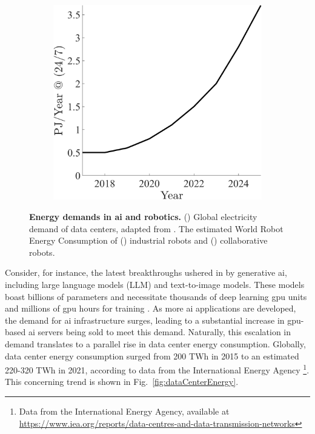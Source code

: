 \documentclass[12pt]{article}
\begin{document}
\begin{figure}[t!]
\begin{subfigure}[b]{0.30\textwidth}
	\end{subfigure}
	\hfill
	\begin{subfigure}[b]{0.30\textwidth}
		\subcaption{}
		\includegraphics[width=\textwidth]{cb_energy_projections.png} \label{fig:cobot_energy}
	\end{subfigure}	
	\hspace*{\fill}
	\caption[] {\label{fig:energy_demands_AI_robotics} \textbf{Energy demands in \ac{ai} and robotics.} () Global electricity demand of data centers, adapted from \cite{andrae2015global}. The estimated World Robot Energy Consumption of () industrial robots and () collaborative robots.}
\end{figure}

Consider, for instance, the latest breakthroughs ushered in by generative \ac{ai}, including large language models (LLM) and text-to-image models. These models boast billions of parameters and necessitate thousands of deep learning \ac{gpu} units and millions of \ac{gpu} hours for training \cite{Vanian2023ChatGPTgenerativeAI, Corbyn2023Nvidiachipmaker}. As more \ac{ai} applications are developed, the demand for \ac{ai} infrastructure surges, leading to a substantial increase in \ac{gpu}-based \ac{ai} servers being sold to meet this demand. Naturally, this escalation in demand translates to a parallel rise in data center energy consumption. Globally, data center energy consumption surged from 200 TWh in 2015 to an estimated 220-320 TWh in 2021, according to data from the International Energy Agency \footnote{Data from the International Energy Agency, available at \url{https://www.iea.org/reports/data-centres-and-data-transmission-networks}}. This concerning trend is shown in Fig.~\ref{fig:dataCenterEnergy}.
\end{document}
